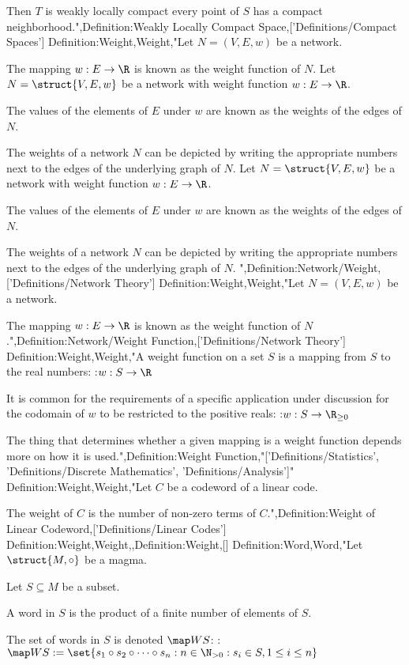 Then $T$ is weakly locally compact  every point of $S$ has a compact neighborhood.",Definition:Weakly Locally Compact Space,['Definitions/Compact Spaces']
Definition:Weight,Weight,"Let $N = \left({V, E, w}\right)$ be a network.

The mapping $w: E \to \R$ is known as the weight function of $N$.
Let $N = \struct {V, E, w}$ be a network with weight function $w: E \to \R$.


The values of the elements of $E$ under $w$ are known as the weights of the edges of $N$.


The weights of a network $N$ can be depicted by writing the appropriate numbers next to the edges of the underlying graph of $N$.
Let $N = \struct {V, E, w}$ be a network with weight function $w: E \to \R$.


The values of the elements of $E$ under $w$ are known as the weights of the edges of $N$.


The weights of a network $N$ can be depicted by writing the appropriate numbers next to the edges of the underlying graph of $N$.
",Definition:Network/Weight,['Definitions/Network Theory']
Definition:Weight,Weight,"Let $N = \left({V, E, w}\right)$ be a network.

The mapping $w: E \to \R$ is known as the weight function of $N$.",Definition:Network/Weight Function,['Definitions/Network Theory']
Definition:Weight,Weight,"A weight function on a set $S$ is a mapping from $S$ to the real numbers:
:$w: S \to \R$


It is common for the requirements of a specific application under discussion for the codomain of $w$ to be restricted to the positive reals:
:$w: S \to \R_{\ge 0}$


The thing that determines whether a given mapping is a weight function depends more on how it is used.",Definition:Weight Function,"['Definitions/Statistics', 'Definitions/Discrete Mathematics', 'Definitions/Analysis']"
Definition:Weight,Weight,"Let $C$ be a codeword of a linear code.

The weight of $C$ is the number of non-zero terms of $C$.",Definition:Weight of Linear Codeword,['Definitions/Linear Codes']
Definition:Weight,Weight,,Definition:Weight,[]
Definition:Word,Word,"Let $\struct {M, \circ}$ be a magma.

Let $S \subseteq M$ be a subset.

A word in $S$ is the product of a finite number of elements of $S$.


The set of words in $S$ is denoted $\map W S$:
:$\map W S := \set {s_1 \circ s_2 \circ \cdots \circ s_n: n \in \N_{>0}: s_i \in S, 1 \le i \le n}$


